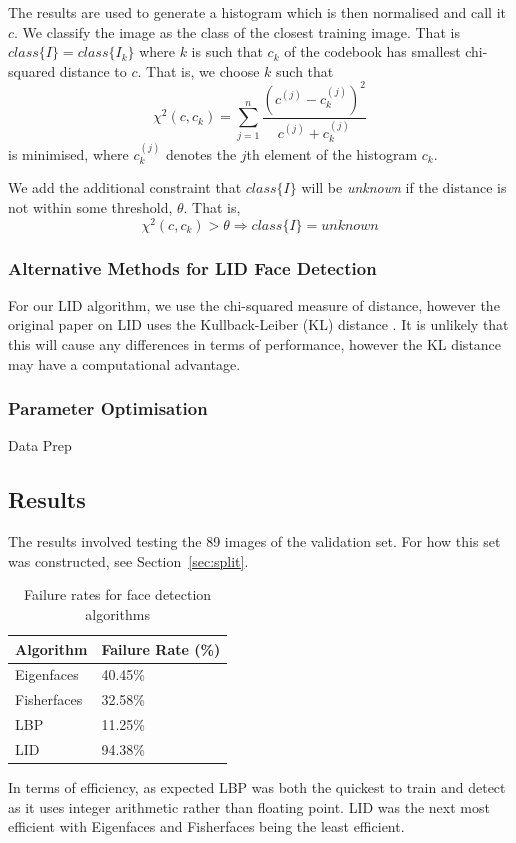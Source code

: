 \documentclass{article}
\begin{document}
The results are used to generate a histogram which is then normalised and call it $c$. We classify the image as the class of the closest training image. That is $class\{I\}=class\{I_k\}$ where $k$ is such that $c_k$ of the codebook has smallest chi-squared distance to $c$. That is, we choose $k$ such that
\begin{equation}
	\chi^2(c, c_k) = \sum_{j=1}^{n}\frac{(c^{(j)} - c^{(j)}_k)^2}{c^{(j)} + c^{(j)}_k}
\end{equation}
is minimised, where $c^{(j)}_k$ denotes the $j$th element of the histogram $c_k$.

We add the additional constraint that $class\{I\}$ will be \textit{unknown} if the distance is not within some threshold, $\theta$. That is,
\begin{equation}
	\chi^2(c, c_k) > \theta \Rightarrow class\{I\} = unknown
\end{equation}

\subsubsection{Alternative Methods for LID Face Detection}
\label{sec:alternativeLID}
For our LID algorithm, we use the chi-squared measure of distance, however the original paper on LID uses the Kullback-Leiber (KL) distance \cite{nguyen2011local}. It is unlikely that this will cause any differences in terms of performance, however the KL distance may have a computational advantage.


\subsubsection{Parameter Optimisation}
Data Prep

\subsection{Results}
The results involved testing the 89 images of the validation set. For how this set was constructed, see Section~\ref{sec:split}.
\begin{table}[H]
	\centering
    \begin{tabular}{|l|l|}
    \hline
    Algorithm & Failure Rate (\%) \\
    \hline
    Eigenfaces & 40.45\% \\
    Fisherfaces & 32.58\% \\
    LBP & 11.25\% \\
    LID & 94.38\% \\
    \hline
    \end{tabular}
    \caption {Failure rates for face detection algorithms}
\end{table}
In terms of efficiency, as expected LBP was both the quickest to train and detect as it uses integer arithmetic rather than floating point. LID was the next most efficient with Eigenfaces and Fisherfaces being the least efficient.
\end{document}
